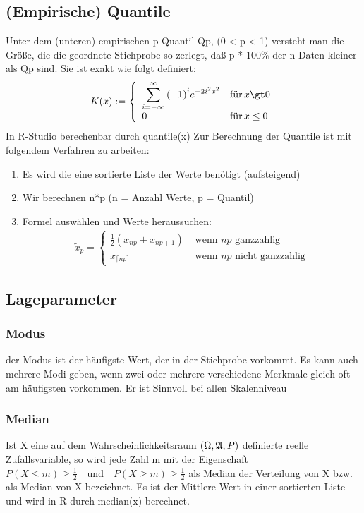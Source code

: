 \documentclass[a4paper,10pt]{scrartcl}
\begin{document}
\subsection{(Empirische) Quantile}
Unter dem (unteren) empirischen p-Quantil Qp, (0 < p < 1) versteht man die Größe, die die geordnete Stichprobe so zerlegt, daß p * 100\% der n Daten kleiner als Qp sind. Sie ist exakt wie folgt definiert:
\begin{eqnarray*}K(x):=\left\{\begin{array}{ll}\displaystyle \sum _{i=-\infty }^{\infty }{(-1)}^{i}{e}^{-2{i}^{2}{x}^{2}} & {\text{f}\rm{\ddot{u}}\text{r}}\,x\gt 0\\ 0 & {\text{f}\rm{\ddot{u}}\text{r}}\,x\le 0\end{array}\right.\end{eqnarray*}
In R-Studio berechenbar durch quantile(x)
Zur Berechnung der Quantile ist mit folgendem Verfahren zu arbeiten:
\begin{enumerate}
    \item Es wird die eine sortierte Liste der Werte benötigt (aufsteigend)
    \item Wir berechnen n*p (n = Anzahl Werte, p = Quantil)
    \item Formel auswählen und Werte heraussuchen:
    \begin{align*}\tilde{x}_p=\begin{cases} \frac{1}{2}(x_{np}+x_{np+1}) & \text{ wenn }np\text{ ganzzahlig}\\ x_{\lceil np \rceil}& \text{ wenn }np\text{ nicht ganzzahlig}\end{cases}
\end{align*}

\end{enumerate}
\subsection{Lageparameter}
\subsubsection{Modus}
der Modus ist der häufigste Wert, der in der Stichprobe vorkommt. Es kann auch mehrere Modi geben, wenn zwei oder mehrere verschiedene Merkmale gleich oft am häufigsten vorkommen. Er ist Sinnvoll bei allen Skalenniveau
\subsubsection{Median}
Ist X eine auf dem Wahrscheinlichkeitsraum $({\rm{\Omega }},{\mathfrak{A}},P)$ definierte reelle Zufallsvariable, so wird jede Zahl m mit der Eigenschaft $P(X\le m)\ge \frac{1}{2}\quad \text{und}\quad P(X\ge m)\ge \frac{1}{2}$
als Median der Verteilung von X bzw. als Median von X bezeichnet. Es ist der Mittlere Wert in einer sortierten Liste und wird in R durch median(x) berechnet.
\end{document}
